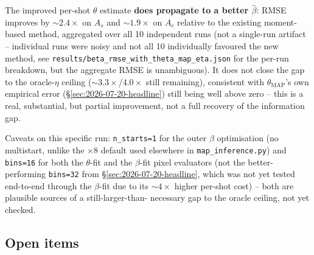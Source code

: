 \documentclass[11pt,a4paper]{article}
\newcommand{\code}[1]{\texttt{#1}}
\begin{document}
The improved per-shot $\theta$ estimate \textbf{does propagate to a better
$\hat\beta$}: RMSE improves by $\sim2.4\times$ on $A_s$ and $\sim1.9\times$
on $A_c$ relative to the existing moment-based method, aggregated over all
10 independent runs (not a single-run artifact -- individual runs were
noisy and not all 10 individually favoured the new method, see
\code{results/beta\_rmse\_with\_theta\_map\_eta.json} for the per-run
breakdown, but the aggregate RMSE is unambiguous). It does not close the
gap to the oracle-$\eta$ ceiling ($\sim3.3\times$/$4.0\times$ still
remaining), consistent with $\theta_{\mathrm{MAP}}$'s own empirical error
(\S\ref{sec:2026-07-20-headline}) still being well above zero -- this is a
real, substantial, but partial improvement, not a full recovery of the
information gap.

Caveats on this specific run: \code{n\_starts=1} for the outer $\beta$
optimisation (no multistart, unlike the $\times 8$ default used elsewhere
in \code{map\_inference.py}) and \code{bins=16} for both the $\theta$-fit
and the $\beta$-fit pixel evaluators (not the better-performing
\code{bins=32} from \S\ref{sec:2026-07-20-headline}, which was not yet
tested end-to-end through the $\beta$-fit due to its $\sim4\times$ higher
per-shot cost) -- both are plausible sources of a still-larger-than-
necessary gap to the oracle ceiling, not yet checked.

\subsection{Open items}
\label{sec:2026-07-20-open}
\end{document}
